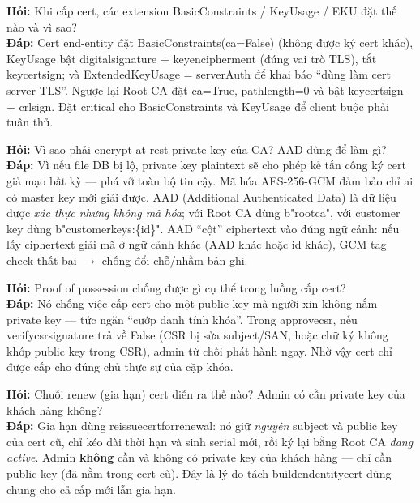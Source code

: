 \documentclass[12pt,a4paper]{article}
\newcommand{\code}[1]{{\ttfamily\small\def\_{\textunderscore\discretionary{}{}{}}#1}}
\begin{document}
\begin{qabox}
\textbf{Hỏi:} Khi cấp cert, các extension BasicConstraints / KeyUsage / EKU đặt
thế nào và vì sao?\\[2pt]
\textbf{Đáp:} Cert end-entity đặt \code{BasicConstraints(ca=False)} (không được
ký cert khác), \code{KeyUsage} bật \code{digital\_signature} +
\code{key\_encipherment} (đúng vai trò TLS), tắt \code{key\_cert\_sign}; và
\code{ExtendedKeyUsage = serverAuth} để khai báo \enquote{dùng làm cert server
TLS}. Ngược lại Root CA đặt \code{ca=True, path\_length=0} và bật
\code{key\_cert\_sign} + \code{crl\_sign}. Đặt critical cho BasicConstraints và
KeyUsage để client buộc phải tuân thủ.
\end{qabox}

\begin{qabox}
\textbf{Hỏi:} Vì sao phải encrypt-at-rest private key của CA? AAD dùng để làm
gì?\\[2pt]
\textbf{Đáp:} Vì nếu file DB bị lộ, private key plaintext sẽ cho phép kẻ tấn
công ký cert giả mạo bất kỳ — phá vỡ toàn bộ tin cậy. Mã hóa AES-256-GCM đảm bảo
chỉ ai có master key mới giải được. AAD (Additional Authenticated Data) là dữ
liệu được \emph{xác thực nhưng không mã hóa}; với Root CA dùng \code{b"root\_ca"},
với customer key dùng \code{b"customer\_keys:\{id\}"}. AAD \enquote{cột}
ciphertext vào đúng ngữ cảnh: nếu lấy ciphertext giải mã ở ngữ cảnh khác (AAD
khác hoặc id khác), GCM tag check thất bại $\to$ chống đổi chỗ/nhầm bản ghi.
\end{qabox}

\begin{qabox}
\textbf{Hỏi:} Proof of possession chống được gì cụ thể trong luồng cấp cert?\\[2pt]
\textbf{Đáp:} Nó chống việc cấp cert cho một public key mà người xin không nắm
private key — tức ngăn \enquote{cướp danh tính khóa}. Trong \code{approve\_csr},
nếu \code{verify\_csr\_signature} trả về False (CSR bị sửa subject/SAN, hoặc chữ
ký không khớp public key trong CSR), admin từ chối phát hành ngay. Nhờ vậy cert
chỉ được cấp cho đúng chủ thực sự của cặp khóa.
\end{qabox}

\begin{qabox}
\textbf{Hỏi:} Chuỗi renew (gia hạn) cert diễn ra thế nào? Admin có cần private
key của khách hàng không?\\[2pt]
\textbf{Đáp:} Gia hạn dùng \code{reissue\_cert\_for\_renewal}: nó giữ
\emph{nguyên} subject và public key của cert cũ, chỉ kéo dài thời hạn và sinh
serial mới, rồi ký lại bằng Root CA \emph{đang active}. Admin \textbf{không} cần
và không có private key của khách hàng — chỉ cần public key (đã nằm trong cert
cũ). Đây là lý do tách \code{\_build\_end\_entity\_cert} dùng chung cho cả cấp
mới lẫn gia hạn.
\end{qabox}
\end{document}
